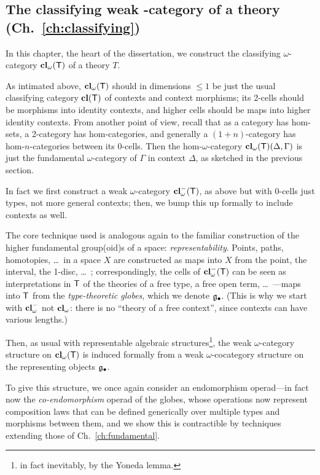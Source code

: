 \subsection*{The classifying weak \pdfomega-category of a theory (Ch.~\ref{ch:classifying})}

\begin{para}In this chapter, the heart of the dissertation, we construct the classifying $\omega$-category $\mathbf{cl}_\omega(\mathsf{T})$ of a theory $T$.

As intimated above, $\mathbf{cl}_\omega(\mathsf{T})$ should in dimensions $\leq 1$ be just the usual classifying category $\mathbf{cl}(\mathsf{T})$ of contexts and context morphisms; its 2-cells should be morphisms into identity contexts, and higher cells should be maps into higher identity contexts.  From another point of view, recall that as a category has hom-sets, a 2-category has hom-categories, and generally a $(1+n)$-category has hom-$n$-categories between its $0$-cells.  Then the hom-$\omega$-category $\mathbf{cl}_\omega(\mathsf{T})(\Delta,\Gamma)$ is just the fundamental $\omega$-category of $\Gamma$ in context $\Delta$, as sketched in the previous section.

In fact we first construct a weak $\omega$-category $\mathbf{cl}_\omega^-(\mathsf{T})$, as above but with 0-cells just types, not more general contexts; then, we bump this up formally to include contexts as well.

The core technique used is analogous again to the familiar construction of the higher fundamental group(oid)s of a space: \emph{representability}.  Points, paths, homotopies, \ldots\ in a space $X$ are constructed as maps into $X$ from the point, the interval, the 1-disc, \ldots\ ; correspondingly, the cells of $\mathbf{cl}_\omega^-(\mathsf{T})$ can be seen as interpretations in $\mathsf{T}$ of the theories of a free type, a free open term, \ldots\ ---maps into $\mathsf{T}$ from the \emph{type-theoretic globes}, which we denote $\mathfrak{g}_\bullet$.  (This is why we start with $\mathbf{cl}_\omega^-$ not $\mathbf{cl}_\omega$: there is no ``theory of a free context'', since contexts can have various lengths.)

Then, as usual with representable algebraic structures\footnote{in fact inevitably, by the Yoneda lemma.}, the weak $\omega$-category structure on $\mathbf{cl}_\omega(\mathsf{T})$ is induced formally from a weak $\omega$-cocategory structure on the representing objects $\mathfrak{g}_\bullet$.

To give this structure, we once again consider an endomorphism operad---in fact now the \emph{co-endomorphism} operad of the globes, whose operations now represent composition laws that can be defined generically over multiple types and morphisms between them, and we show this is contractible by techniques extending those of Ch.~\ref{ch:fundamental}.
\end{para}


